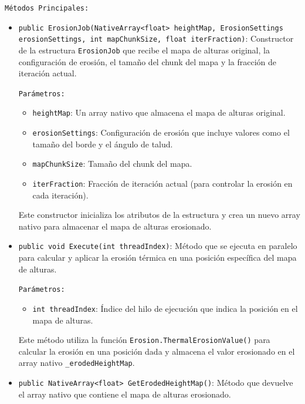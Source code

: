 \begin{enumerate}
    \texttt{Métodos Principales:}

    \begin{itemize}
        \item \texttt{public ErosionJob(NativeArray<float> heightMap, ErosionSettings \\erosionSettings, int mapChunkSize, float iterFraction)}: Constructor de la estructura \texttt{ErosionJob} que recibe el mapa de alturas original, la configuración de erosión, el tamaño del chunk del mapa y la fracción de iteración actual.

        \texttt{Parámetros:}

        \begin{itemize}
            \item \texttt{heightMap}: Un array nativo que almacena el mapa de alturas original.
            \item \texttt{erosionSettings}: Configuración de erosión que incluye valores como el tamaño del borde y el ángulo de talud.
            \item \texttt{mapChunkSize}: Tamaño del chunk del mapa.
            \item \texttt{iterFraction}: Fracción de iteración actual (para controlar la erosión en cada iteración).
        \end{itemize}

        Este constructor inicializa los atributos de la estructura y crea un nuevo array nativo para almacenar el mapa de alturas erosionado.

        \item \texttt{public void Execute(int threadIndex)}: Método que se ejecuta en paralelo para calcular y aplicar la erosión térmica en una posición específica del mapa de alturas.

        \texttt{Parámetros:}

        \begin{itemize}
            \item \texttt{int threadIndex}: Índice del hilo de ejecución que indica la posición en el mapa de alturas.
        \end{itemize}

        Este método utiliza la función \texttt{Erosion.ThermalErosionValue()} para calcular la erosión en una posición dada y almacena el valor erosionado en el array nativo \texttt{\_erodedHeightMap}.

        \item \texttt{public NativeArray<float> GetErodedHeightMap()}: Método que devuelve el array nativo que contiene el mapa de alturas erosionado.


\end{itemize}
\end{enumerate}
